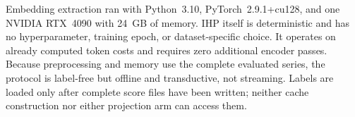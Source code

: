 Embedding extraction ran with Python~3.10, PyTorch~2.9.1+cu128, and one
NVIDIA RTX~4090 with 24~GB of memory. IHP itself is deterministic and has no
hyperparameter, training epoch, or dataset-specific choice. It operates on
already computed token costs and requires zero additional encoder passes.
Because preprocessing and memory use the complete evaluated series, the
protocol is label-free but offline and transductive, not streaming. Labels are
loaded only after complete score files have been written; neither cache
construction nor either projection arm can access them.

